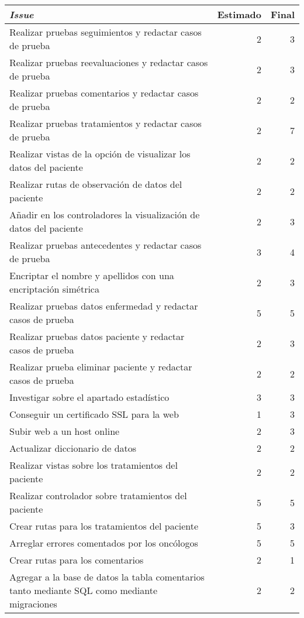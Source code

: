 \begin{table}[H]
	 \begin{tabularx}{\linewidth}{X r r}
	 	\toprule \textbf{\textit{Issue}} & \textbf{Estimado} & \textbf{Final}\\
	 	\toprule
	 	Realizar pruebas seguimientos y redactar casos de prueba  & 2 & 3 \\
        Realizar pruebas reevaluaciones y redactar casos de prueba  & 2 & 3 \\
        Realizar pruebas comentarios y redactar casos de prueba & 2 & 2 \\
        Realizar pruebas tratamientos y redactar casos de prueba  & 2 & 7 \\
        Realizar vistas de la opción de visualizar los datos del paciente & 2  & 2 \\
        Realizar rutas de observación de datos del paciente & 2 & 2 \\
        Añadir en los controladores la visualización de datos del paciente  & 2 &  3\\
        Realizar pruebas antecedentes y redactar casos de prueba  & 3 & 4 \\
        Encriptar el nombre y apellidos con una encriptación simétrica & 2 & 3  \\
        Realizar pruebas datos enfermedad y redactar casos de prueba  & 5 & 5 \\
        Realizar pruebas datos paciente y redactar casos de prueba  & 2 & 3 \\
        Realizar prueba eliminar paciente y redactar casos de prueba  & 2 & 2  \\
        Investigar sobre el apartado estadístico & 3 & 3 \\
        Conseguir un certificado SSL para la web & 1 & 3 \\
        Subir web a un host online & 2 & 3 \\
        Actualizar diccionario de datos & 2 & 2 \\
        Realizar vistas sobre los tratamientos del paciente & 2 & 2 \\
        Realizar controlador sobre tratamientos del paciente & 5 & 5 \\
        Crear rutas para los tratamientos del paciente & 5 & 3 \\
        Arreglar errores comentados por los oncólogos & 5 & 5 \\
        Crear rutas para los comentarios & 2 & 1 \\
        Agregar a la base de datos la tabla comentarios tanto mediante SQL como mediante migraciones & 2 & 2 \\

\end{tabularx}
\end{table}

